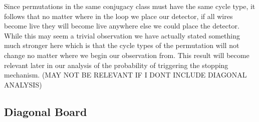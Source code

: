     Since permutations in the same conjugacy class must have the same cycle type, it follows that no matter where in the loop we place our detector, if all wires become live they will become live anywhere else we could place the detector. 
    While this may seem a trivial observation we have actually stated something much stronger here which is that the cycle types of the permutation will not change no matter where we begin our observation from. This result will become relevant later in our analysis of 
    the probability of triggering the stopping mechanism. (MAY NOT BE RELEVANT IF I DONT INCLUDE DIAGONAL ANALYSIS)
    \subsection{Diagonal Board}
    